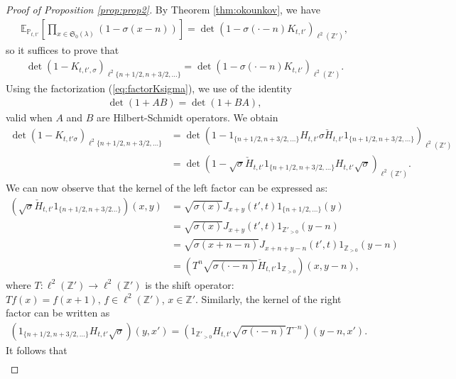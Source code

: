 \documentclass[10pt,a4paper]{amsart}
\newcommand{\E}{\mathbb{E}}
\renewcommand{\P}{\mathbb{P}}
\newcommand{\Z}{\mathbb{Z}}
\begin{document}
\begin{proof}[Proof of Proposition \ref{prop:prop2}]
By Theorem \ref{thm:okounkov}, we have
\begin{align*}
    \E_{\P_{t,t'}} \left[ \prod_{x\in \mathfrak{S}_0(\lambda)}(1-\sigma(x-n) )\right] = \det(1- \sigma(\cdot-n)K_{t,t'})_{\ell^2(\Z')},
\end{align*}
so it suffices to prove that
\begin{align*}
    \det(1-K_{t,t',\sigma})_{\ell^2\{n+1/2,n+3/2,\dots\}}= \det(1- \sigma(\cdot-n)K_{t,t'})_{\ell^2(\Z')}.
\end{align*}
Using the factorization (\ref{eq:factorKsigma}), we use of the identity
\begin{align*}
\det(1 + AB ) = \det(1 +BA),
\end{align*}
valid when $A$ and $B$ are Hilbert-Schmidt operators. We obtain
\begin{align*}
\det \left( 1 -K_{t,t'\sigma} \right)_{\ell^2 \{n+1/2,n+3/2, \dots \}} &= \det \left( 1 - \mathfrak{1}_{ \{n+1/2,n+3/2, \dots \} } H_{t,t'} \sigma \check{H}_{t,t'} \mathfrak{1}_{ \{n+1/2,n+3/2,\dots \} } \right)_{\ell^2(\Z')}\\
&= \det \left(1 - \sqrt{\sigma} \check{H}_{t,t'} \mathfrak{1}_{\{n+1/2,n+3/2,\dots\}}H_{t,t'} \sqrt{\sigma} \right)_{\ell^2(\Z')}.
\end{align*}
We can now observe that the kernel of the left factor can be expressed as:
\begin{align*}
    \left(\sqrt{\sigma} \check{H}_{t,t'} \mathfrak{1}_{\{n+1/2,n+3/2\dots\}}\right)(x,y)&=\sqrt{\sigma(x)}J_{x+y}(t',t)\mathfrak{1}_{\{n+1/2,\dots\}}(y) \\
    &= \sqrt{\sigma(x)}J_{x+y}(t',t)\mathfrak{1}_{\Z'_{>0}}(y-n) \\
    &=\sqrt{\sigma(x+n-n)} J_{x+n+y-n}(t',t) \mathfrak{1}_{\Z_{>0}}(y-n)\\
    &=\left(T^n\sqrt{\sigma(\cdot-n)}\check{H}_{t,t'}\mathfrak{1}_{\Z_{>0}}\right)(x,y-n),
\end{align*}
where $T: \ell^2(\Z') \to \ell^2(\Z')$ is the shift operator: $Tf(x)=f(x+1), \, f \in \ell^2(\Z')$,  $x \in \Z'$. Similarly, the kernel of the right factor can be written as
\begin{align*}
    \left( \mathfrak{1}_{\{n+1/2,n+3/2,\dots\}} H_{t,t'}\sqrt{\sigma} \right)(y,x') = \left(\mathfrak{1}_{\Z'_{>0}} H_{t,t'}\sqrt{\sigma(\cdot-n)}T^{-n}\right)(y-n,x').
\end{align*}
It follows that
\begin{align*}

\end{align*}
\end{proof}
\end{document}
